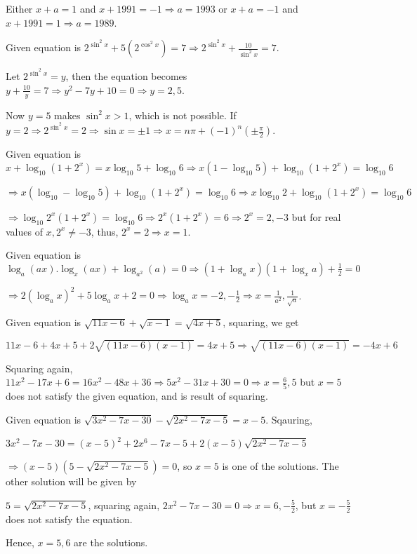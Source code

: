   Either $x + a = 1$ and $x + 1991 = -1\Rightarrow a = 1993$ or $x + a = -1$ and $x + 1991 = 1\Rightarrow a
  = 1989$.
\item Given equation is $2^{\sin^2x} + 5(2^{\cos^2x}) = 7 \Rightarrow 2^{\sin^2x} + \frac{10}{\sin^2x} = 7$.

  Let $2^{\sin^2x} = y$, then the equation becomes $y + \frac{10}{y} = 7 \Rightarrow y^2 - 7y + 10 = 0
  \Rightarrow y = 2, 5$.

  Now $y = 5$ makes $\sin^2x > 1$, which is not possible. If $y = 2\Rightarrow 2^{\sin^2x} = 2\Rightarrow
  \sin x = \pm1 \Rightarrow x = n\pi + (-1)^n\left(\pm\frac{\pi}{2}\right)$.
\item Given equation is $x + \log_{10}(1 + 2^x) = x\log_{10}5 + \log_{10}6 \Rightarrow x(1 - \log_{10}5) +
  \log_{10}(1 + 2^x) = \log_{10}6$

  $\Rightarrow x(\log_{10} - \log_{10}5) + \log_{10}(1 + 2^x) = \log_{10}6 \Rightarrow x\log_{10}2 +
  \log_{10}(1 + 2^x) = \log_{10}6$

  $\Rightarrow \log_{10}2^x(1 + 2^x) = \log_{10}6\Rightarrow 2^x(1 + 2^x) = 6\Rightarrow 2^x = 2, -3$ but
  for real values of $x, 2^x\neq -3$, thus, $2^x = 2 \Rightarrow x = 1$.
\item Given equation is $\log_a(ax).\log_x(ax) + \log_{a^2}(a) = 0\Rightarrow (1 + \log_ax)(1 + \log_xa) +
  \frac{1}{2} = 0$

  $\Rightarrow 2(\log_ax)^2 + 5\log_ax + 2 = 0 \Rightarrow \log_ax = -2, -\frac{1}{2}\Rightarrow x =
  \frac{1}{a^2}, \frac{1}{\sqrt{a}}$.
\item Given equation is $\sqrt{11x - 6} + \sqrt{x - 1} = \sqrt{4x + 5}$, squaring, we get

  $11x - 6 + 4x + 5 + 2\sqrt{(11x - 6)(x - 1)} = 4x + 5 \Rightarrow \sqrt{(11x - 6)(x - 1)} = -4x + 6$

  Squaring again, $11x^2 - 17x + 6 = 16x^2 - 48x + 36 \Rightarrow 5x^2 - 31x + 30 = 0\Rightarrow x =
  \frac{6}{5}, 5$ but $x = 5$ does not satisfy the given equation, and is result of squaring.
\item Given equation is $\sqrt{3x^2 - 7x - 30} - \sqrt{2x^2 - 7x - 5} = x - 5$. Sqauring,

  $3x^2 - 7x - 30 = (x - 5)^2 + 2x^6 - 7x - 5 + 2(x - 5)\sqrt{2x^2 - 7x - 5}$

  $\Rightarrow (x - 5)(5 - \sqrt{2x^2 - 7x - 5}) = 0$, so $x = 5$ is one of the solutions. The other
  solution will be given by

  $5 = \sqrt{2x^2 - 7x - 5}$, squaring again, $2x^2 - 7x - 30 = 0\Rightarrow x = 6, -\frac{5}{2}$, but $x =
  -\frac{5}{2}$ does not satisfy the equation.

  Hence, $x = 5, 6$ are the solutions.
\stopitemize
